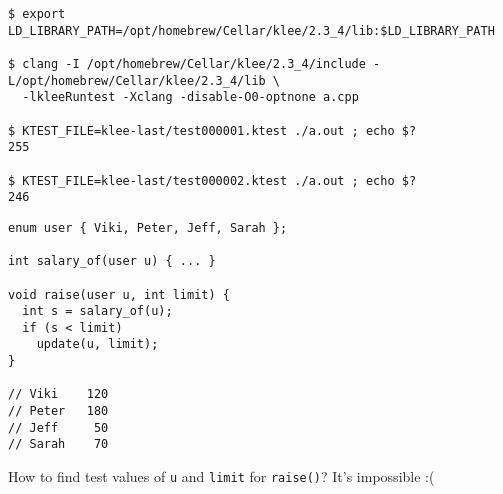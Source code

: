 \documentclass{article}
\begin{document}
{\scriptsize\begin{verbatim}
$ export LD_LIBRARY_PATH=/opt/homebrew/Cellar/klee/2.3_4/lib:$LD_LIBRARY_PATH

$ clang -I /opt/homebrew/Cellar/klee/2.3_4/include -L/opt/homebrew/Cellar/klee/2.3_4/lib \
  -lkleeRuntest -Xclang -disable-O0-optnone a.cpp

$ KTEST_FILE=klee-last/test000001.ktest ./a.out ; echo $?
255

$ KTEST_FILE=klee-last/test000002.ktest ./a.out ; echo $?
246
\end{verbatim}
}

\plush{}



\begin{pptWide}{2}
{\scriptsize\begin{verbatim}
enum user { Viki, Peter, Jeff, Sarah };

int salary_of(user u) { ... }

void raise(user u, int limit) {
  int s = salary_of(u);
  if (s < limit)
    update(u, limit);
}

// Viki    120
// Peter   180
// Jeff     50
// Sarah    70
\end{verbatim}
}
\par\columnbreak\par
{}
\end{pptWide}

How to find test values of \texttt{u} and \texttt{limit} for \texttt{raise()}? It's impossible :(
\end{document}
